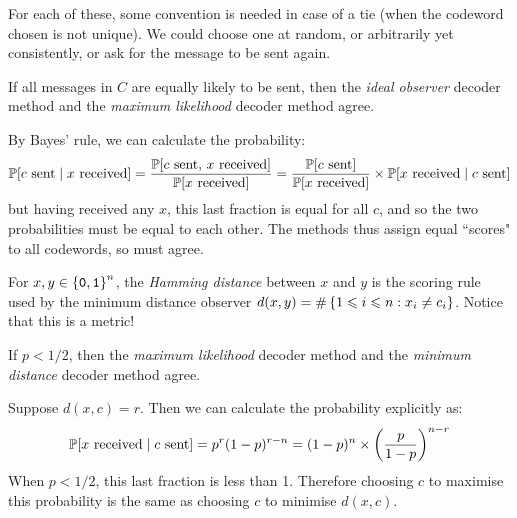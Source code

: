 \documentclass{article}
\begin{document}
\begin{note}
	For each of these, some convention is needed in case of a tie (when the codeword chosen is not unique). We could choose one at random, or arbitrarily yet consistently, or ask for the message to be sent again.
\end{note}

\begin{proposition}
	\label{decoder-agreement-ideal-observer-max-likelihood}
    If all messages in $C$ are equally likely to be sent, then the \textit{ideal observer} decoder method and the \textit{maximum likelihood} decoder method agree.
\end{proposition}
\begin{prf}
    By Bayes' rule, we can calculate the probability:
    \[
	\P[c \text{ sent} \mid x \text{ received}] = \frac{\P[c \text{ sent}, \, x \text{ received}]}{\P[x \text{ received}]} = \frac{\P[c \text{ sent}]}{\P[x \text{ received}]} \times \P[x \text{ received} \mid c \text{ sent}]
	\]
	but having received any $x$, this last fraction is equal for all $c$, and so the two probabilities must be equal to each other. The methods thus assign equal ``scores" to all codewords, so must agree.
\end{prf}

\begin{definition}
	\label{hamming-distance}
    For $x, y \in \set{\texttt{0}, \texttt{1}}^n$, the \textit{Hamming distance} between $x$ and $y$ is the scoring rule used by the minimum distance observer $d(x, y) = \#\set{1 \leq i \leq n : x_i \neq c_i}$. Notice that this is a metric!
\end{definition}

\begin{proposition}
	\label{decoder-agreement-max-likelihood-min-distance}
    If $p < 1/2$, then the \textit{maximum likelihood} decoder method and the \textit{minimum distance} decoder method agree.
\end{proposition}
\begin{prf}
	Suppose $d(x, c) = r$. Then we can calculate the probability explicitly as:
	\[
	\P[x \text{ received} \mid c \text{ sent}] = p^r(1-p)^{r-n} = (1-p)^n
 \times \left( \frac{p}{1-p} \right)^{n-r}
	\]
	When $p < 1/2$, this last fraction is less than 1. Therefore choosing $c$ to maximise this probability is the same as choosing $c$ to minimise $d(x, c)$.
\end{prf}
\end{document}
